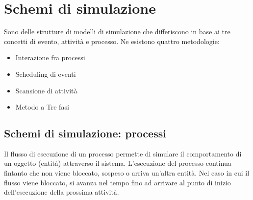 \section{Schemi di simulazione}
Sono delle strutture di modelli di simulazione che differiscono in base ai tre concetti di evento, attività e processo. Ne esistono quattro metodologie:
\begin{itemize}
    \item Interazione fra processi
    \item Scheduling di eventi
    \item Scansione di attività
    \item Metodo a Tre fasi
\end{itemize}

\subsection{Schemi di simulazione: processi}
Il flusso di esecuzione di un processo permette di simulare il comportamento di un oggetto (entità) attraverso il sistema. L'esecuzione del processo continua fintanto che non viene bloccato, sospeso o arriva un'altra entità. Nel caso in cui il flusso viene bloccato, si avanza nel tempo fino ad arrivare al punto di inizio dell'esecuzione della prossima attività.
